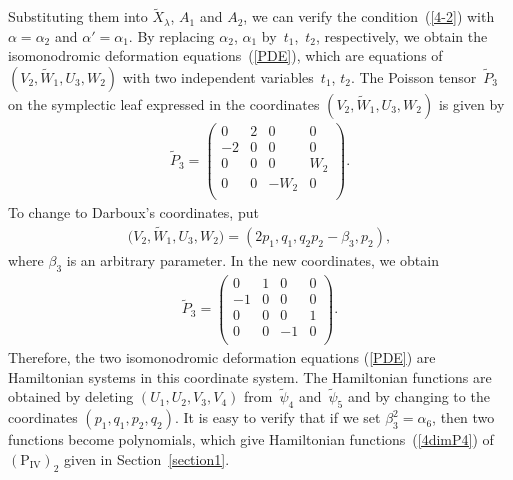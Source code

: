 \documentclass[pdftex]{sigma}
\numberwithin{equation}{section}
\begin{document}
Substituting them into $\widetilde{X}_\lambda$, $A_1$ and $A_2$, we can verify the condition~(\ref{4-2}) with $\alpha = \alpha _2$ and $\alpha ' = \alpha _1$. By replacing $\alpha _2$, $\alpha _1$ by~$t_1$,~$t_2$, respectively, we obtain the isomonodromic deformation equations~(\ref{PDE}), which are equations of $(V_2,\widetilde{W}_1 ,U_3, W_2)$ with two independent variables~$t_1$, $t_2$. The Poisson tensor~$\widetilde{P}_3$ on the symplectic leaf expressed in the coordinates $(V_2,\widetilde{W}_1 ,U_3, W_2)$ is given by
\begin{gather*}
\widetilde{P}_3 = \left(
\begin{matrix}
0 &2 &0 &0 \\
-2&0 &0 &0 \\
0&0 &0 &W_2 \\
0&0 &-W_2 &0 \\
\end{matrix}
\right).
\end{gather*}
To change to Darboux's coordinates, put
\begin{gather*}
\big(V_2,\widetilde{W}_1 ,U_3, W_2\big) = (2p_1, q_1, q_2p_2- \beta_3, p_2),
\end{gather*}
where $\beta_3$ is an arbitrary parameter. In the new coordinates, we obtain
\begin{gather}
\widetilde{P}_3 = \left(
\begin{matrix}
0 &1 &0 &0 \\
-1&0 &0 &0 \\
0&0 &0 &1 \\
0&0 &-1 &0 \\
\end{matrix}
\right).\label{P}
\end{gather}
Therefore, the two isomonodromic deformation equations (\ref{PDE}) are Hamiltonian systems in this coordinate system. The Hamiltonian functions are obtained by deleting $(U_1,U_2,V_3,V_4)$ from~$\widetilde{\psi}_4$ and~$\widetilde{\psi}_5$ and by changing to the coordinates $(p_1, q_1, p_2, q_2)$. It is easy to verify that if we set $\beta_3^2=\alpha _6$, then two functions become polynomials, which give Hamiltonian functions~(\ref{4dimP4}) of~$(\text{P}_\text{IV})_2$ given in Section~\ref{section1}.
\end{document}
